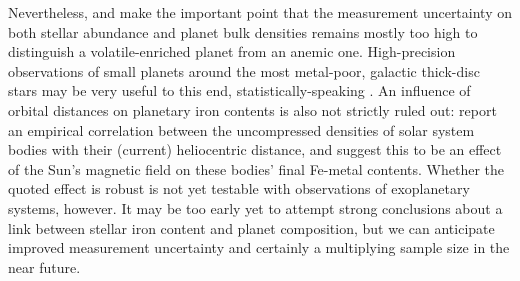 Nevertheless, \citet{schulze_probability_2020} and \citet{unterborn_nominal_2023} make the important point that the measurement uncertainty on both stellar abundance and planet bulk densities remains mostly too high to distinguish a volatile-enriched planet from an anemic one. High-precision observations of small planets around the most metal-poor, galactic thick-disc stars may be very useful to this end, statistically-speaking \citep[e.g.,][]{brinkman_toi561_2023}. An influence of orbital distances on planetary iron contents is also not strictly ruled out: \citet{mcdonough_terrestrial_2021} report an empirical correlation between the uncompressed densities of solar system bodies with their (current) heliocentric distance, and suggest this to be an effect of the Sun's magnetic field on these bodies' final Fe-metal contents. Whether the quoted effect is robust is not yet testable with observations of exoplanetary systems, however. It may be too early yet to attempt strong conclusions about a link between stellar iron content and planet composition, but we can anticipate improved measurement uncertainty and certainly a multiplying sample size in the near future.
 




